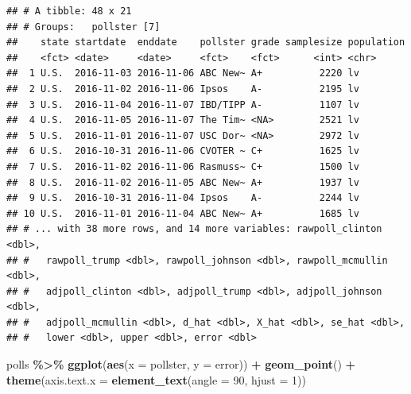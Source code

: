 \documentclass[
]{article}
\newenvironment{Shaded}{\begin{snugshade}}{\end{snugshade}}
\newcommand{\CommentTok}[1]{\textcolor[rgb]{0.56,0.35,0.01}{\textit{#1}}}
\newcommand{\DataTypeTok}[1]{\textcolor[rgb]{0.13,0.29,0.53}{#1}}
\newcommand{\DecValTok}[1]{\textcolor[rgb]{0.00,0.00,0.81}{#1}}
\newcommand{\FloatTok}[1]{\textcolor[rgb]{0.00,0.00,0.81}{#1}}
\newcommand{\KeywordTok}[1]{\textcolor[rgb]{0.13,0.29,0.53}{\textbf{#1}}}
\newcommand{\NormalTok}[1]{#1}
\newcommand{\OperatorTok}[1]{\textcolor[rgb]{0.81,0.36,0.00}{\textbf{#1}}}
\newcommand{\StringTok}[1]{\textcolor[rgb]{0.31,0.60,0.02}{#1}}
\begin{document}
\begin{Shaded}
\end{Shaded}

\begin{verbatim}
## # A tibble: 48 x 21
## # Groups:   pollster [7]
##    state startdate  enddate    pollster grade samplesize population
##    <fct> <date>     <date>     <fct>    <fct>      <int> <chr>     
##  1 U.S.  2016-11-03 2016-11-06 ABC New~ A+          2220 lv        
##  2 U.S.  2016-11-02 2016-11-06 Ipsos    A-          2195 lv        
##  3 U.S.  2016-11-04 2016-11-07 IBD/TIPP A-          1107 lv        
##  4 U.S.  2016-11-05 2016-11-07 The Tim~ <NA>        2521 lv        
##  5 U.S.  2016-11-01 2016-11-07 USC Dor~ <NA>        2972 lv        
##  6 U.S.  2016-10-31 2016-11-06 CVOTER ~ C+          1625 lv        
##  7 U.S.  2016-11-02 2016-11-06 Rasmuss~ C+          1500 lv        
##  8 U.S.  2016-11-02 2016-11-05 ABC New~ A+          1937 lv        
##  9 U.S.  2016-10-31 2016-11-04 Ipsos    A-          2244 lv        
## 10 U.S.  2016-11-01 2016-11-04 ABC New~ A+          1685 lv        
## # ... with 38 more rows, and 14 more variables: rawpoll_clinton <dbl>,
## #   rawpoll_trump <dbl>, rawpoll_johnson <dbl>, rawpoll_mcmullin <dbl>,
## #   adjpoll_clinton <dbl>, adjpoll_trump <dbl>, adjpoll_johnson <dbl>,
## #   adjpoll_mcmullin <dbl>, d_hat <dbl>, X_hat <dbl>, se_hat <dbl>,
## #   lower <dbl>, upper <dbl>, error <dbl>
\end{verbatim}

\begin{Shaded}
\begin{Highlighting}[]
\NormalTok{polls }\OperatorTok{\%\textgreater{}\%}\StringTok{ }\KeywordTok{ggplot}\NormalTok{(}\KeywordTok{aes}\NormalTok{(}\DataTypeTok{x =}\NormalTok{ pollster, }\DataTypeTok{y =}\NormalTok{ error)) }\OperatorTok{+}
\StringTok{  }\KeywordTok{geom\_point}\NormalTok{() }\OperatorTok{+}
\StringTok{  }\KeywordTok{theme}\NormalTok{(}\DataTypeTok{axis.text.x =} \KeywordTok{element\_text}\NormalTok{(}\DataTypeTok{angle =} \DecValTok{90}\NormalTok{, }\DataTypeTok{hjust =} \DecValTok{1}\NormalTok{))}
\end{Highlighting}
\end{Shaded}
\end{document}
